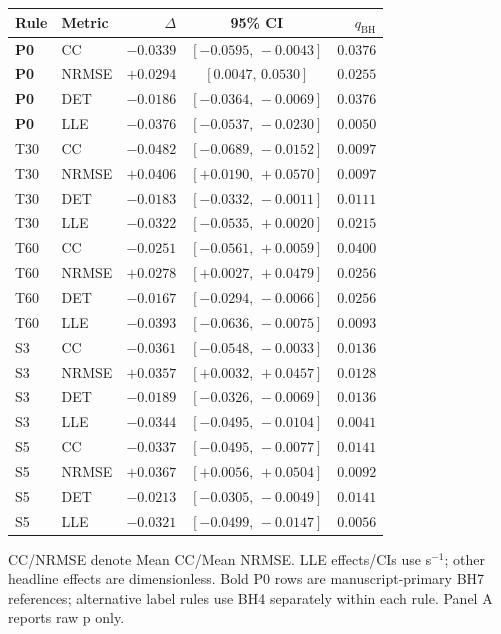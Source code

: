 \documentclass[conference,a4paper]{IEEEtran}
\begin{document}
\begin{table}[!tbp]
\begin{minipage}[t]{0.49\textwidth}
\begin{tabular*}{\linewidth}{@{\extracolsep{\fill}}llrcr@{}}
\toprule
Rule & Metric & $\Delta$ & 95\% CI & $q_{\mathrm{BH}}$\\
\midrule
\textbf{P0} & CC    & $-0.0339$ & $[-0.0595,\,-0.0043]$ & $0.0376$\\
\textbf{P0} & NRMSE & $+0.0294$ & $[0.0047,\,0.0530]$   & $0.0255$\\
\textbf{P0} & DET   & $-0.0186$ & $[-0.0364,\,-0.0069]$ & $0.0376$\\
\textbf{P0} & LLE   & $-0.0376$ & $[-0.0537,\,-0.0230]$ & $0.0050$\\
T30 & CC    & $-0.0482$ & $[-0.0689,\,-0.0152]$ & $0.0097$\\
T30 & NRMSE & $+0.0406$ & $[+0.0190,\,+0.0570]$ & $0.0097$\\
T30 & DET   & $-0.0183$ & $[-0.0332,\,-0.0011]$ & $0.0111$\\
T30 & LLE   & $-0.0322$ & $[-0.0535,\,+0.0020]$ & $0.0215$\\
T60 & CC    & $-0.0251$ & $[-0.0561,\,+0.0059]$ & $0.0400$\\
T60 & NRMSE & $+0.0278$ & $[+0.0027,\,+0.0479]$ & $0.0256$\\
T60 & DET   & $-0.0167$ & $[-0.0294,\,-0.0066]$ & $0.0256$\\
T60 & LLE   & $-0.0393$ & $[-0.0636,\,-0.0075]$ & $0.0093$\\
S3  & CC    & $-0.0361$ & $[-0.0548,\,-0.0033]$ & $0.0136$\\
S3  & NRMSE & $+0.0357$ & $[+0.0032,\,+0.0457]$ & $0.0128$\\
S3  & DET   & $-0.0189$ & $[-0.0326,\,-0.0069]$ & $0.0136$\\
S3  & LLE   & $-0.0344$ & $[-0.0495,\,-0.0104]$ & $0.0041$\\
S5  & CC    & $-0.0337$ & $[-0.0495,\,-0.0077]$ & $0.0141$\\
S5  & NRMSE & $+0.0367$ & $[+0.0056,\,+0.0504]$ & $0.0092$\\
S5  & DET   & $-0.0213$ & $[-0.0305,\,-0.0049]$ & $0.0141$\\
S5  & LLE   & $-0.0321$ & $[-0.0499,\,-0.0147]$ & $0.0056$\\
\bottomrule
\end{tabular*}
\end{minipage}

\par\smallskip
\raggedright
CC/NRMSE denote Mean CC/Mean NRMSE. LLE effects/CIs use s$^{-1}$; other headline effects are dimensionless. Bold P0 rows are manuscript-primary BH7 references; alternative label rules use BH4 separately within each rule. Panel A reports raw p only.

\end{table}
\end{document}
